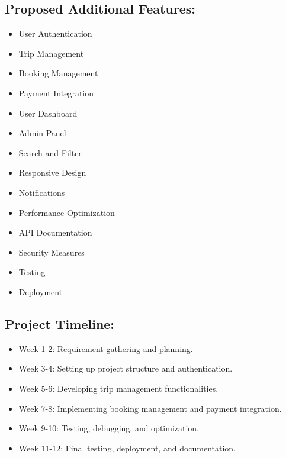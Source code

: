 \documentclass[12pt]{article}
\begin{document}
{\subsection*{Proposed Additional Features:}
\begin{itemize}
    \item User Authentication
    \item Trip Management
    \item Booking Management
    \item Payment Integration
    \item User Dashboard
    \item Admin Panel
    \item Search and Filter
    \item Responsive Design
    \item Notifications
    \item Performance Optimization
    \item API Documentation
    \item Security Measures
    \item Testing
    \item Deployment
\end{itemize}

\subsection*{Project Timeline:}
\begin{itemize}
    \item Week 1-2: Requirement gathering and planning.
    \item Week 3-4: Setting up project structure and authentication.
    \item Week 5-6: Developing trip management functionalities.
    \item Week 7-8: Implementing booking management and payment integration.
    \item Week 9-10: Testing, debugging, and optimization.
    \item Week 11-12: Final testing, deployment, and documentation.
\end{itemize}

}
\end{document}
